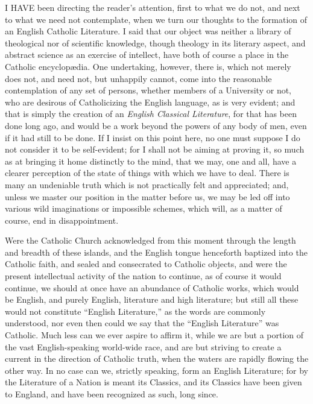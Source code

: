 I HAVE been directing the reader's attention, first to what we do
not, and next to what we need not contemplate, when we turn our
thoughts to the formation of an English Catholic Literature. I said
that our object was neither a library of theological nor of scientific
knowledge, though theology in its literary aspect, and abstract
science as an exercise of intellect, have both of course a place in
the Catholic encyclopædia. One undertaking, however, there is, which
not merely does not, and need not, but unhappily cannot, come into the
reasonable contemplation of any set of persons, whether members of a
University or not, who are desirous of Catholicizing the English
language, as is very evident; and that is simply the creation of an \emph{English
Classical Literature}, for that has been done long ago, and would
be a work beyond the powers of any body of men, even if it had still
to be done. If I insist on this point here, no one must suppose I do
not consider it to be self-evident; for I shall not be aiming at
proving it, so much as at bringing it home distinctly to the mind,
that we may, one and all, have a clearer perception of the state of
things with which we have to deal. There is many an undeniable truth
which is not practically felt and appreciated; and, unless we master
our position in the matter before us, we may be led off into various
wild imaginations or impossible schemes, which will, as a matter of
course, end in disappointment.

Were the Catholic Church acknowledged from this moment through the
length and breadth of these islands, and the English tongue henceforth
baptized into the Catholic faith, and sealed and consecrated to
Catholic objects, and were the present intellectual activity of the
nation to continue, as of course it would continue, we should at once
have an abundance of Catholic works, which would be English, and
purely English, literature and high literature; but still all these
would not constitute ``English Literature,'' as the words are
commonly understood, nor even then could we say that the ``English
Literature'' was Catholic. Much less can we ever aspire to affirm
it, while we are but a portion of the vast English-speaking world-wide
race, and are but striving to create a current in the direction of
Catholic truth, when the waters are rapidly flowing the other way. In
no case can we, strictly speaking, form an English Literature; for by
the Literature of a Nation is meant its Classics, and its Classics
have been given to England, and have been recognized as such, long
since.


